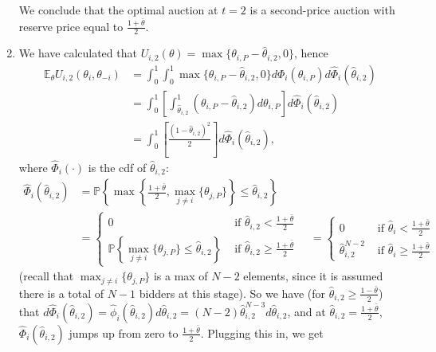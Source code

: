 \documentclass[a4paper]{article}
\begin{document}
\begin{enumerate}
	We conclude that the optimal auction at $t=2$ is a second-price auction with reserve price equal to $\frac{1+\bar{\theta}}{2}$. 
	
	\item We have calculated that $U_{i,2}(\theta) = \max \{ \theta_{i,P} - \hat{\theta}_{i,2}, 0 \}$, hence
	\begin{align*}
		\mathbb{E}_\theta U_{i,2}(\theta_i,\theta_{-i}) &= \int_0^1 \int_0^1 \max \{ \theta_{i,P} - \hat{\theta}_{i,2}, 0 \} d \Phi_i(\theta_{i,P}) d \hat{\Phi}_i (\hat{\theta}_{i,2}) 
		\\
		&= \int_0^1 \left[ \int_{\hat{\theta}_{i,2}}^1 (\theta_{i,P} - \hat{\theta}_{i,2}) d\theta_{i,P} \right] d \hat{\Phi}_i (\hat{\theta}_{i,2}) 
		\\
		&= \int_0^1 \left[ \frac{(1-\hat{\theta}_{i,2})^2}{2} \right] d \hat{\Phi}_i (\hat{\theta}_{i,2}),
	\end{align*}
	where $\hat{\Phi}_i (\cdot)$ is the cdf of $\hat{\theta}_{i,2}$:
	\begin{align*}
		\hat{\Phi}_i (\hat{\theta}_{i,2}) &= \mathbb{P} \left\{ \max \left\{\frac{1+\bar{\theta}}{2}, \max_{j \neq i} \{ \theta_{j,P} \} \right\} \leq \hat{\theta}_{i,2} \right\}
		\\
		& = \begin{cases}
			0 & \text{ if } \hat{\theta}_{i,2} < \frac{1+\bar{\theta}}{2}
			\\
			\mathbb{P} \left\{ \max_{j \neq i} \{ \theta_{j,P} \} \leq \hat{\theta}_{i,2} \right\} & \text{ if } \hat{\theta}_{i,2} \geq \frac{1+\bar{\theta}}{2}
		\end{cases}
		\quad 
		= \begin{cases}
			0 & \text{ if } \hat{\theta}_i < \frac{1+\bar{\theta}}{2}
			\\
			\hat{\theta}_{i,2}^{N-2} & \text{ if } \hat{\theta}_i \geq \frac{1+\bar{\theta}}{2}
		\end{cases}
	\end{align*}
	(recall that $\max_{j \neq i} \{ \theta_{j,P} \}$ is a max of $N-2$ elements, since it is assumed there is a total of $N-1$ bidders at this stage). So we have (for $\hat{\theta}_{i,2} \geq \frac{1-\bar{\theta}}{2}$) that $d \hat{\Phi}_i (\hat{\theta}_{i,2}) = \hat{\phi}_i(\hat{\theta}_{i,2}) d \hat{\theta}_{i,2} = (N-2) \hat{\theta}_{i,2}^{N-3} d \hat{\theta}_{i,2}$, and at $\hat{\theta}_{i,2}=\frac{1+\bar{\theta}}{2}$, $\hat{\Phi}_i(\hat{\theta}_{i,2})$ jumps up from zero to $\frac{1+\bar{\theta}}{2}$. Plugging this in, we get
	\begin{align}

\end{align}
\end{enumerate}
\end{document}
